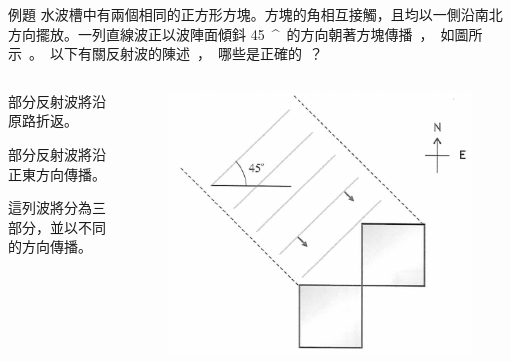 \documentclass[13pt]{beamer}
\begin{document}
\begin{frame}{例題}
    水波槽中有兩個相同的正方形方塊。方塊的角相互接觸，且均以一側沿南北方向擺放。一列直線波正以波陣面傾鈄 \qty{45}{^{\circ}} 的方向朝著方塊傳播，如圖所示。以下有關反射波的陳述，哪些是正確的？
    \begin{columns}
        \begin{schoices}
            \item 部分反射波將沿原路折返。
            \item 部分反射波將沿正東方向傳播。
            \item 這列波將分為三部分，並以不同的方向傳播。
        \end{schoices}
        \begin{figure}
            \centering
            \includegraphics[width=0.7\linewidth]{images/Screenshot 2023-09-27 at 5.38.43 PM.png}


        \end{figure}
    \end{columns}

\end{frame}
\end{document}
